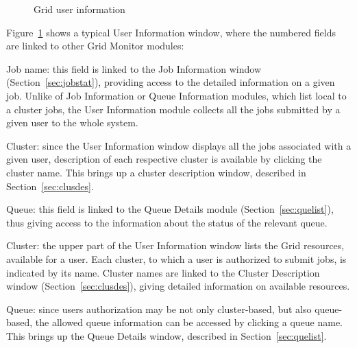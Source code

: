 \documentclass{article}
\begin{document}
\begin{figure}
\caption{\label{fig:userlist}Grid user information}
\end{figure}

Figure~\ref{fig:userlist} shows a typical User Information window, where
the numbered fields are linked to other Grid Monitor modules:
\begin{list}{)}{ \itemsep=-0.5mm}
\item \textsf{Job name}:  this field is linked to
  the Job Information window (Section~\ref{sec:jobstat}), providing
  access to the detailed information on a given job. Unlike of Job
  Information or Queue Information modules, which list local to a
  cluster jobs, the User Information module collects all the jobs
  submitted by a given user to the whole system.
\item \textsf{Cluster}: since the User Information window displays all
  the jobs associated with a given user, description of each
  respective cluster is available by clicking the cluster name. This
  brings up a cluster description window, described in
  Section~\ref{sec:clusdes}.
\item \textsf{Queue}: this field is linked to the Queue Details module
  (Section~\ref{sec:quelist}), thus giving access to the information
  about the status of the relevant queue.
\item \textsf{Cluster}: the upper part of the User Information window
  lists the Grid resources, available for a user. Each cluster,
  to which a user is authorized to submit jobs, is indicated by its
  name.  Cluster names are linked to the Cluster Description window
  (Section~\ref{sec:clusdes}), giving detailed information on
  available resources.
\item \textsf{Queue}: since users authorization may be not only
  cluster-based, but also queue-based, the allowed queue information
  can be accessed by clicking a queue name. This brings up the Queue
  Details window, described in Section~\ref{sec:quelist}.
\end{list}
\end{document}
